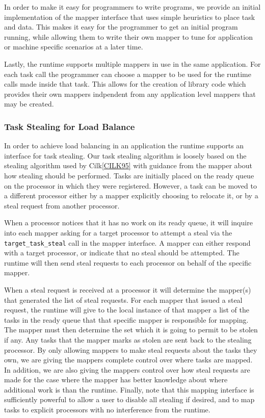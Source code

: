 In order to make it easy for programmers to write programs, we provide an initial implementation 
of the mapper interface that uses simple heuristics to place task and data.  This makes it easy
for the programmer to get an initial program running, while allowing them to write their own
mapper to tune for application or machine specific scenarios at a later time.

Lastly, the runtime supports multiple mappers in use in the same application.  For each task 
call the programmer can choose a mapper to be used for the runtime calls made inside that
task.  This allows for the creation of library code which provides their own mappers indpendent
from any application level mappers that may be created.

\subsubsection{Task Stealing for Load Balance}
\label{subsec:steal}
In order to achieve load balancing in an application the runtime supports an interface
for task stealing.  Our task stealing algorithm is loosely based on the stealing algorithm
used by Cilk\ref{CILK95} with guidance from the mapper about how stealing should be
performed.  Tasks are initially placed on the ready queue on the processor in which they
were registered.  However, a task can be moved to a different processor either by a mapper
explicitly choosing to relocate it, or by a steal request from another processor.

When a processor notices that it has no work on its ready queue, it will inquire into each
mapper asking for a target processor to attempt a steal via the {\tt target\_task\_steal}
call in the mapper interface.  A mapper can either respond with
a target processor, or indicate that no steal should be attempted.  The runtime will then
send steal requests to each processor on behalf of the specific mapper.  

When a steal request is received at a processor it will determine the mapper(s) that generated
the list of steal requests.  For each mapper that issued a steal request, the runtime will
give to the local instance of that mapper a list of the tasks in the ready queue that that
specific mapper is responsible for mapping.  The mapper must then determine the set which
it is going to permit to be stolen if any.  Any tasks that the mapper marks as stolen are
sent back to the stealing processor.  By only allowing mappers to make steal requests about
the tasks they own, we are giving the mappers complete control over where tasks are mapped.
In addition, we are also giving the mappers control over how steal requests are made for
the case where the mapper has better knowledge about where additional work is than the 
runtime.  Finally, note that this mapping interface is sufficiently powerful to allow a user to
disable all stealing if desired, and to map tasks to explicit processors with no interference
from the runtime.

